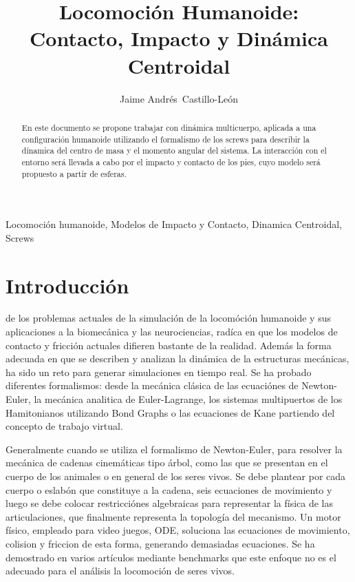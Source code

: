 \documentclass[journal,letterpaper,twoside,twocolumn]{IEEEtran}
\title{Locomoción Humanoide:\\Contacto, Impacto y Dinámica Centroidal}
\author{Jaime Andrés~Castillo-León}
\begin{document}
\maketitle
\begin{abstract}
  En este documento se propone trabajar con dinámica multicuerpo, aplicada a una configuración humanoide utilizando el formalismo de los screws para describir la dínamica del centro de masa y el momento angular del sistema. La interacción con el entorno será llevada a cabo por el impacto y contacto de los pies, cuyo modelo será propuesto a partir de esferas.
\end{abstract}
\begin{IEEEkeywords}
  Locomoción humanoide, Modelos de Impacto y Contacto, Dinamica Centroidal, Screws
\end{IEEEkeywords}

\section{Introducción}
\label{sec:intro}
 de los problemas actuales de la simulación de la locomóción humanoide y sus aplicaciones a la biomecánica y las neurociencias, radíca en que los modelos de contacto y fricción actuales difieren bastante de la realidad\cite{Todorov2014}. Además la forma adecuada en que se describen y analizan la dinámica de la estructuras mecánicas, ha sido un reto para generar simulaciones en tiempo real\cite{Wensing2016}. Se ha probado diferentes formalismos: desde la mecánica clásica de las ecuaciónes de Newton-Euler, la mecánica analitica de Euler-Lagrange, los sistemas multipuertos de los Hamitonianos utilizando Bond Graphs o las ecuaciones de Kane partiendo del concepto de trabajo virtual. 

Generalmente cuando se utiliza el formalismo de Newton-Euler, para resolver la mecánica de cadenas cinemáticas tipo árbol, como las que se presentan en el cuerpo de los animales o en general de los seres vivos. Se debe plantear por cada cuerpo o eslabón que constituye a la cadena, seis ecuaciones de movimiento y luego se debe colocar restricciónes algebraicas para representar la física de las articulaciones, que finalmente representa la topología del mecanismo\cite{Taga1991}. Un motor físico, empleado para video juegos, ODE\cite{Smith2007}, soluciona las ecuaciones de movimiento, colision y friccion de esta forma, generando demasiadas ecuaciones. Se ha demostrado en varios artículos mediante benchmarks\cite{Sherman2011a,Erez2015} que este enfoque no es el adecuado para el análisis la locomoción de seres vivos\cite{Geijtenbeek2013,Wensing2015}.
\end{document}
